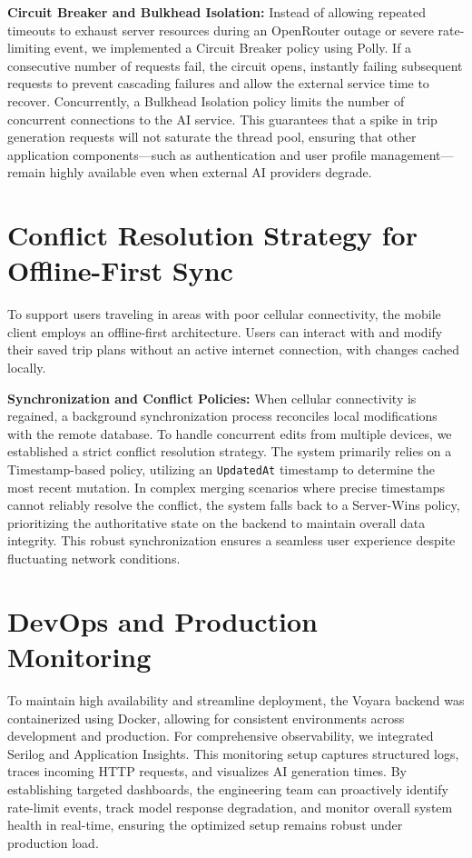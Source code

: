 \textbf{Circuit Breaker and Bulkhead Isolation:}
Instead of allowing repeated timeouts to exhaust server resources during an OpenRouter outage or severe rate-limiting event, we implemented a Circuit Breaker policy using Polly. If a consecutive number of requests fail, the circuit opens, instantly failing subsequent requests to prevent cascading failures and allow the external service time to recover. Concurrently, a Bulkhead Isolation policy limits the number of concurrent connections to the AI service. This guarantees that a spike in trip generation requests will not saturate the thread pool, ensuring that other application components---such as authentication and user profile management---remain highly available even when external AI providers degrade.

\section{Conflict Resolution Strategy for Offline-First Sync}
To support users traveling in areas with poor cellular connectivity, the mobile client employs an offline-first architecture. Users can interact with and modify their saved trip plans without an active internet connection, with changes cached locally.

\textbf{Synchronization and Conflict Policies:}
When cellular connectivity is regained, a background synchronization process reconciles local modifications with the remote database. To handle concurrent edits from multiple devices, we established a strict conflict resolution strategy. The system primarily relies on a Timestamp-based policy, utilizing an \texttt{UpdatedAt} timestamp to determine the most recent mutation. In complex merging scenarios where precise timestamps cannot reliably resolve the conflict, the system falls back to a Server-Wins policy, prioritizing the authoritative state on the backend to maintain overall data integrity. This robust synchronization ensures a seamless user experience despite fluctuating network conditions.

\section{DevOps and Production Monitoring}
To maintain high availability and streamline deployment, the Voyara backend was containerized using Docker, allowing for consistent environments across development and production. For comprehensive observability, we integrated Serilog and Application Insights. This monitoring setup captures structured logs, traces incoming HTTP requests, and visualizes AI generation times. By establishing targeted dashboards, the engineering team can proactively identify rate-limit events, track model response degradation, and monitor overall system health in real-time, ensuring the optimized setup remains robust under production load.
